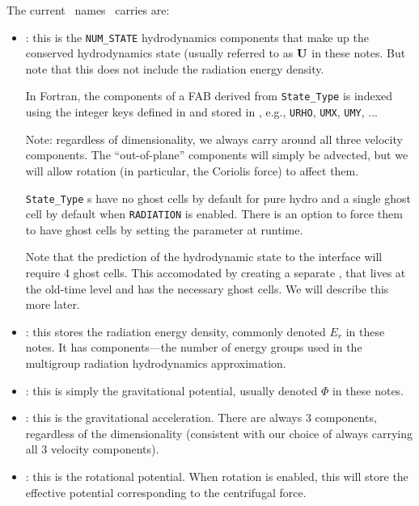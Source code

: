 The current \statedata\ names  \castro\ carries are:
\begin{itemize}
\item {} : this is the {\tt NUM\_STATE} hydrodynamics
  components that make up the conserved hydrodynamics state (usually
  referred to as ${\bf U}$ in these notes.  But note that this does
  not include the radiation energy density.

  In Fortran, the components of a FAB derived from {\tt State\_Type}
  is indexed using the integer keys defined in 
  and stored in , e.g., {\tt URHO}, {\tt UMX},
  {\tt UMY}, ...

  Note: regardless of dimensionality, we always carry around all
  three velocity components.  The ``out-of-plane'' components
  will simply be advected, but we will allow rotation (in particular,
  the Coriolis force) to affect them.

  {\tt State\_Type} \multifab s have no ghost cells by default for
  pure hydro and a single ghost cell by default when {\tt RADIATION}
  is enabled.  There is an option to force them to have ghost cells by
  setting the parameter  at runtime.

  Note that the prediction of the hydrodynamic state to the interface
  will require 4 ghost cells.  This accomodated by creating a separate
  \multifab,  that lives at the old-time level and
  has the necessary ghost cells.  We will describe this more later.

\item {} : this stores the radiation energy density,
  commonly denoted $E_r$ in these notes.  It has 
  components---the number of energy groups used in the multigroup
  radiation hydrodynamics approximation. 

\item {} : this is simply the gravitational
  potential, usually denoted $\Phi$ in these notes.

\item {} : this is the gravitational
  acceleration. There are always 3 components, regardless of the
  dimensionality (consistent with our choice of always carrying all 3
  velocity components).

\item {} : this is the rotational potential.
  When rotation is enabled, this will store the effective potential
  corresponding to the centrifugal force. 


\end{itemize}
